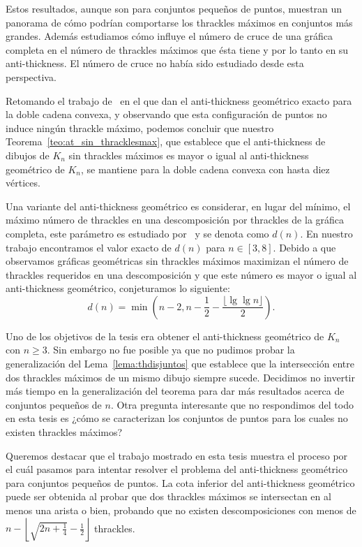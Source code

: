 Estos resultados, aunque son para conjuntos pequeños de puntos, muestran un panorama de cómo podrían
comportarse los thrackles máximos en conjuntos más grandes. Además estudiamos cómo influye el número de
cruce de una gráfica completa en el número de thrackles máximos que ésta tiene y por lo tanto en su
anti-thickness. El número de cruce no había sido estudiado desde esta perspectiva.

Retomando el trabajo de~\cite{Lomeli2018} en el que dan el anti-thickness geométrico exacto para la doble
cadena convexa, y observando que esta configuración de puntos no induce ningún thrackle máximo, podemos
concluir que nuestro Teorema~\ref{teo:at_sin_thracklesmax}, que establece que el anti-thickness de dibujos
de $K_n$ sin thrackles máximos es mayor o igual al anti-thickness geométrico de $K_n$, se mantiene para la
doble cadena convexa con hasta diez vértices.

Una variante del anti-thickness geométrico es considerar, en lugar del mínimo, el máximo número de
thrackles en una descomposición por thrackles de la gráfica completa, este parámetro es estudiado
por~\cite{Araujo2005} y se denota como $d(n)$. En nuestro trabajo encontramos el valor exacto de $d(n)$
para $n \in [3,8]$. Debido a que observamos gráficas geométricas sin thrackles máximos maximizan el número de thrackles requeridos en una descomposición y que este número es mayor o igual al anti-thickness geométrico, conjeturamos lo siguiente:
\[
d(n) =  \min\left(n-2,n-\frac{1}{2}-\frac{\lfloor \lg \lg n\rfloor}{2}\right).
\]

Uno de los objetivos de la tesis era obtener el anti-thickness geométrico de $K_n$ con $n\geq 3$. Sin
embargo no fue posible ya que no pudimos probar la generalización del Lema~\ref{lema:thdisjuntos} que
establece que la intersección entre dos thrackles máximos de un mismo dibujo siempre sucede. Decidimos no
invertir más tiempo en la generalización del teorema para dar más resultados acerca de conjuntos pequeños de
$n$. Otra pregunta interesante que no respondimos del todo en esta tesis es ¿cómo se caracterizan los
conjuntos de puntos para los cuales no existen thrackles máximos?

Queremos destacar que el trabajo mostrado en esta tesis muestra el proceso por el cuál pasamos para
intentar resolver el problema del anti-thickness geométrico para conjuntos pequeños de puntos. La cota
inferior del anti-thickness geométrico puede ser obtenida al probar que dos thrackles máximos se
intersectan en al menos una arista o bien, probando que no existen descomposiciones con menos de $n -
\left\lfloor \sqrt{2n + \frac{1}{4}} - \frac{1}{2}\right\rfloor$ thrackles.

